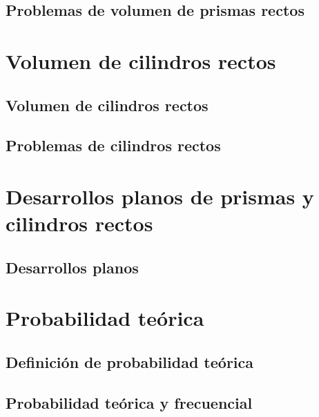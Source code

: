 \documentclass[11pt]{book}
\begin{document}
\subsection{Problemas de volumen de prismas rectos}

\section{Volumen de cilindros rectos}
\subsection{Volumen de cilindros rectos}
\subsection{Problemas de cilindros rectos}

\section{Desarrollos planos de prismas y cilindros rectos}
\subsection{Desarrollos planos}

\section{Probabilidad teórica}
\subsection{Definición de probabilidad teórica}
\subsection{Probabilidad teórica y frecuencial}
\end{document}
